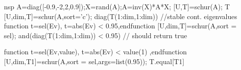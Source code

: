 \begin{examples}
  \begin{mintednsp}{nsp}
    A=diag([-0.9,-2,2,0.9]);X=rand(A);A=inv(X)*A*X;
    [U,T]=schur(A);
    T
    [U,dim,T]=schur(A,sort='c');
    diag(T(1:dim,1:dim))      //stable cont. eigenvalues
    function t=sel(Ev), t=abs(Ev) < 0.95,endfunction
    [U,dim,T]=schur(A,sort = sel);
    and(diag(T(1:dim,1:dim)) < 0.95) // should return true
    
    function t=sel(Ev,value), t=abs(Ev) < value(1) ,endfunction
    [U,dim,T1]=schur(A,sort = sel,args=list(0.95));
    T.equal[T1]
  \end{mintednsp}
\end{examples}
\begin{manseealso}
   
\end{manseealso}
